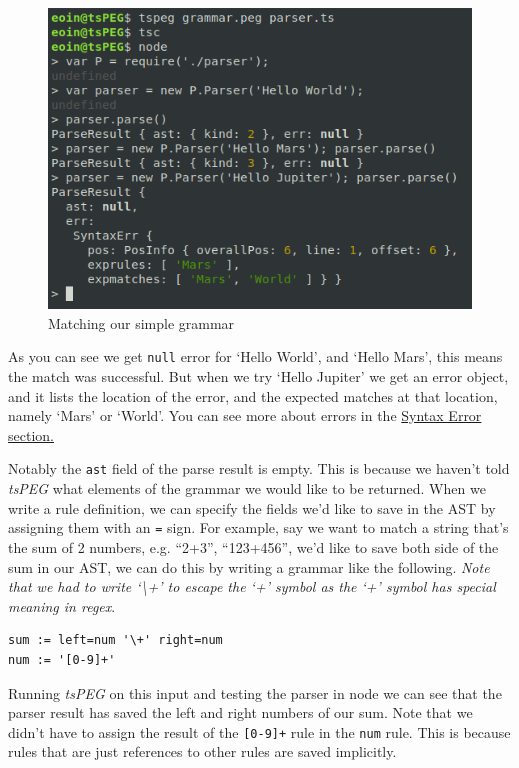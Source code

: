 \begin{figure}[ht]
\caption{Matching our simple grammar}
\label{basictspegexample}
\centering
    \includegraphics[scale=0.7]{src/app1assets/example1.png}
\end{figure}

As you can see we get \texttt{null} error for `Hello World', and `Hello
Mars', this means the match was successful. But when we try `Hello
Jupiter' we get an error object, and it lists the location of the error,
and the expected matches at that location, namely `Mars' or `World'. You
can see more about errors in the
\protect\hyperlink{syntax-errors}{Syntax Error section.}

Notably the \texttt{ast} field of the parse result is empty. This is
because we haven't told \emph{tsPEG} what elements of the grammar we
would like to be returned. When we write a rule definition, we can
specify the fields we'd like to save in the AST by assigning them with
an \texttt{=} sign. For example, say we want to match a string that's
the sum of 2 numbers, e.g. ``2+3'', ``123+456'', we'd like to save both
side of the sum in our AST, we can do this by writing a grammar like the
following. \emph{Note that we had to write `\textbackslash{}+' to escape
the `+' symbol as the `+' symbol has special meaning in regex}.

\begin{verbatim}
sum := left=num '\+' right=num
num := '[0-9]+'
\end{verbatim}

Running \emph{tsPEG} on this input and testing the parser in node we can
see that the parser result has saved the left and right numbers of our
sum. Note that we didn't have to assign the result of the
\texttt{{[}0-9{]}+} rule in the \texttt{num} rule. This is because rules
that are just references to other rules are saved implicitly.

